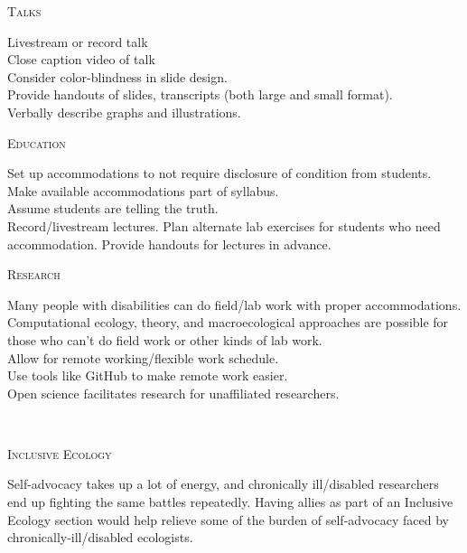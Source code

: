 \documentclass{beamer}
\begin{document}
\begin{center}
\begin{minipage}{0.42\linewidth}
\begin{Large}
\textsc{Talks\\}
\end{Large}
Livestream or record talk\\
Close caption video of talk\\
Consider color-blindness in slide design.\\
Provide handouts of slides, transcripts (both large and small format).\\
Verbally describe graphs and illustrations.\\

\begin{Large}
\textsc{Education\\}
\end{Large}
Set up accommodations to not require disclosure of condition from students.\\
Make available accommodations part of syllabus.\\
Assume students are telling the truth.\\
Record/livestream lectures.
Plan alternate lab exercises for students who need accommodation.
Provide handouts for lectures in advance.\\

\begin{Large}
\textsc{Research\\}
\end{Large}
Many people with disabilities can do field/lab work with proper accommodations.\\
Computational ecology, theory, and macroecological approaches are possible for those who can't do field work or other kinds of lab work.\\
Allow for remote working/flexible work schedule.\\
Use tools like GitHub to make remote work easier.\\
Open science facilitates research for unaffiliated researchers.\\

\end{minipage}
\hspace{1cm}
\begin{minipage}{0.25\linewidth}
\vspace{0.5cm}
~\\
\begin{Large}
\textsc{Inclusive Ecology}\\
\end{Large}
Self-advocacy takes up a lot of energy, and chronically ill/disabled researchers end up fighting the same battles repeatedly.  Having allies as part of an Inclusive Ecology section would help relieve some of the burden of self-advocacy faced by chronically-ill/disabled ecologists.\\



\end{minipage}
\end{center}
\end{document}
